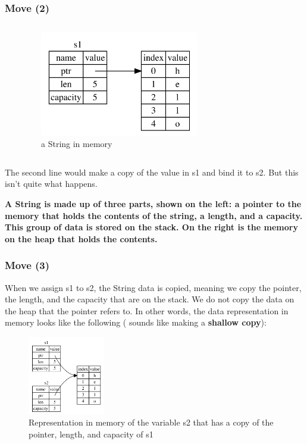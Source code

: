 \documentclass{beamer}
\begin{document}
\begin{frame}[fragile]
	\frametitle{Move (2)}
	
	\begin{columns}
		\inputminted{rust}{./code/move-string.rs}
		\begin{figure}
			\centering
			\includegraphics[width=0.65\textwidth]{./img/trpl04-01.png}
			\caption{a String in memory}
			\label{fig:figureS1}
		\end{figure}
	\end{columns}
	
	The second line would make a copy of the value in s1 and bind it to s2. But this isn’t quite what happens.
	
	\textbf{A String is made up of three parts, shown on the left: a pointer to the memory that holds the contents of the string, a length, and a capacity. This group of data is stored on the stack. On the right is the memory on the heap that holds the contents.}
\end{frame}


\begin{frame}[fragile]
	\frametitle{Move (3)}
	When we assign s1 to s2, the String data is copied, meaning we copy the pointer, the length, and the capacity that are on the stack. We do not copy the data on the heap that the pointer refers to. In other words, the data representation in memory looks like the following ( sounds like making a \textbf{shallow copy}):
	\begin{figure}
		\centering
		\includegraphics[width=0.3\textwidth]{./img/trpl04-02.png}
		\caption{Representation in memory of the variable s2 that has a copy of the pointer, length, and capacity of s1}
		\label{fig:figureS2}
	\end{figure}
\end{frame}
\end{document}
